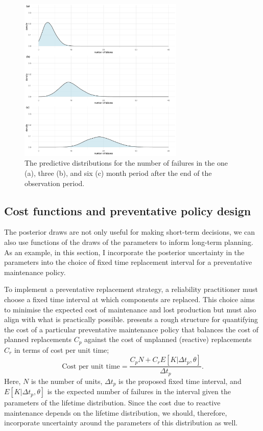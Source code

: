 \begin{figure}
  \centering
  \includegraphics[width=0.7\textwidth]{./figures/ch-3/E-n-failures-densities.pdf}
  \caption{The predictive distributions for the number of failures in the one (a), three (b), and six (c) month period after the end of the observation period.}
  \label{fig:E-Nfailrues-densities}
\end{figure}

\subsection{Cost functions and preventative policy design} \label{subsec:idler-cost-function}

The posterior draws are not only useful for making short-term decisions, we can also use functions of the draws of the parameters to inform long-term planning. As an example, in this section, I incorporate the posterior uncertainty in the parameters into the choice of fixed time replacement interval for a preventative maintenance policy.

To implement a preventative replacement strategy, a reliability practitioner must choose a fixed time interval at which components are replaced. This choice aims to minimise the expected cost of maintenance and lost production but must also align with what is practically possible. \citet{jardine2013} presents a rough structure for quantifying the cost of a particular preventative maintenance policy that balances the cost of planned replacements $C_p$ against the cost of unplanned (reactive) replacements $C_r$ in terms of cost per unit time; 
\begin{equation*}
 \text{Cost per unit time} = \frac{C_p N + C_r E[K|\Delta t_p,\theta]}{\Delta t_p}.
\end{equation*}
Here, $N$ is the number of units, $\Delta t_p$ is the proposed fixed time interval, and $E[K|\Delta t_p,\theta]$ is the expected number of failures in the interval given the parameters of the lifetime distribution. Since the cost due to reactive maintenance depends on the lifetime distribution, we should, therefore, incorporate uncertainty around the parameters of this distribution as well.


